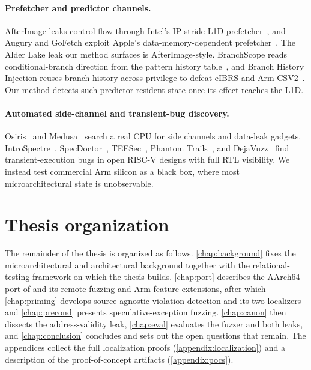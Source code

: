 \paragraph{Prefetcher and predictor channels.}
AfterImage leaks control flow through Intel's IP-stride L1D prefetcher~\cite{afterimage}, and
Augury and GoFetch exploit Apple's data-memory-dependent prefetcher~\cite{augury,gofetch}. The
Alder Lake leak our method surfaces is AfterImage-style. BranchScope reads conditional-branch
direction from the pattern history table~\cite{branchscope}, and Branch History Injection reuses
branch history across privilege to defeat eIBRS and Arm CSV2~\cite{bhi}. Our method detects such
predictor-resident state once its effect reaches the L1D.

\paragraph{Automated side-channel and transient-bug discovery.}
Osiris~\cite{osiris} and Medusa~\cite{transynther} search a real CPU for side channels and
data-leak gadgets. IntroSpectre~\cite{introspectre}, SpecDoctor~\cite{specdoctor},
TEESec~\cite{teesec}, Phantom Trails~\cite{phantom_trails}, and DejaVuzz~\cite{dejavuzz} find
transient-execution bugs in open RISC-V designs with full RTL visibility. We instead test
commercial Arm silicon as a black box, where most microarchitectural state is unobservable.

\section{Thesis organization}
\label{sec:intro-organization}

The remainder of the thesis is organized as follows. \autoref{chap:background} fixes the
microarchitectural and architectural background together with the relational-testing framework
on which the thesis builds. \autoref{chap:port} describes the AArch64 port of \revizor{} and
its remote-fuzzing and Arm-feature extensions, after which \autoref{chap:priming} develops
source-agnostic violation detection and its two localizers and \autoref{chap:precond} presents
speculative-exception fuzzing. \autoref{chap:canon} then dissects the address-validity leak,
\autoref{chap:eval} evaluates the fuzzer and both leaks, and
\autoref{chap:conclusion} concludes and sets out the open questions that remain. The
appendices collect the full localization proofs (\autoref{appendix:localization}) and a
description of the proof-of-concept artifacts (\autoref{appendix:pocs}).
